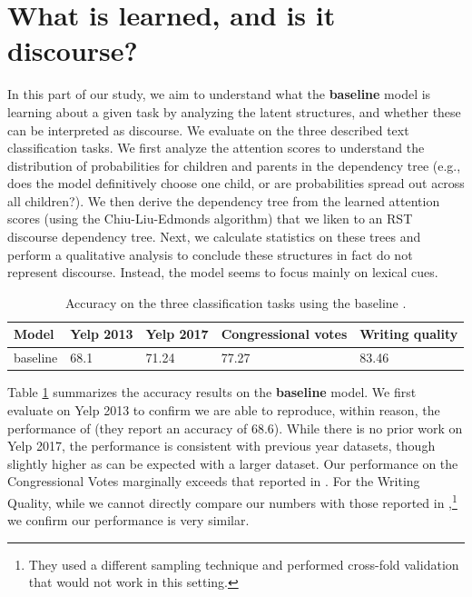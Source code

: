 \section{What is learned, and is it discourse?}
\label{sec:latent_learned}
In this part of our study, we aim to understand what the \textbf{baseline} model is learning about a given  task by analyzing the latent structures, and whether these can be interpreted as discourse. We evaluate on the three described text classification tasks. We first analyze the attention scores to understand the distribution of probabilities for children and parents in the dependency tree (e.g., does the model definitively choose one child, or are probabilities spread out across all children?). We then derive the dependency tree from the learned attention scores (using the Chiu-Liu-Edmonds algorithm) that we liken to an RST discourse dependency tree. Next, we calculate statistics on these trees and perform a qualitative analysis to conclude these structures in fact do not represent discourse. Instead, the model seems to focus mainly on lexical cues.

\begin{table}[t]
\centering
\begin{tabular}{lllll}
\toprule
Model &Yelp 2013 &Yelp 2017 &Congressional votes &Writing quality \\\hline \hline 
baseline &68.1 & 71.24 & 77.27 & 83.46 \\
\bottomrule
\end{tabular}
\caption{Accuracy on the three classification tasks using the baseline .}
\label{tab:latent_accuracy}
\end{table}

Table \ref{tab:latent_accuracy} summarizes the accuracy results on the \textbf{baseline} model. We first evaluate on Yelp 2013 \cite{Tang:2015} to confirm we are able to reproduce, within reason, the performance of  (they report an accuracy of 68.6). While there is no prior work on Yelp 2017, the performance is consistent with previous year datasets, though slightly higher as can be expected with a larger dataset. Our performance on the Congressional Votes marginally exceeds that reported in \cite{Liu:2018}. For the Writing Quality, while we cannot directly compare our numbers with those reported in ,\footnote{They used a different sampling technique and performed cross-fold validation that would not work in this setting.} we confirm our performance is very similar.

